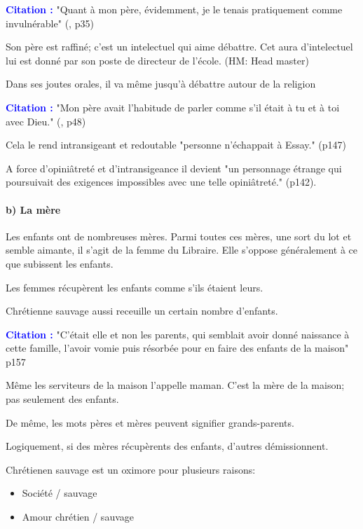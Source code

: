 \documentclass[a4paper, 11pt, hidelinks]{article}
\newcommand{\cit}{\large \textcolor{blue}{\textbf{Citation :}} \large }
\newcommand{\rb}[1]{\Romanbar{#1}}
\begin{document}
\cit "Quant à mon père, évidemment, je le tenais pratiquement comme invulnérable" (\rb{1}, p35)


Son père est raffiné; c'est un intelectuel qui aime débattre. Cet aura d'intelectuel lui est donné par son poste de directeur de l'école. (HM: Head master)


Dans ses joutes orales, il va même jusqu'à débattre autour de la religion

\cit "Mon père avait l'habitude de parler comme s'il était à tu et à toi avec Dieu." (\rb{1}, p48)

Cela le rend intransigeant et redoutable "personne n'échappait à Essay." (p147)

A force d'opiniâtreté et d'intransigeance il devient "un personnage étrange qui poursuivait des exigences impossibles avec une telle opiniâtreté." (p142).





\paragraph{b) La mère}



Les enfants ont de nombreuses mères. Parmi toutes ces mères, une sort du lot et semble aimante, il s'agit de la femme du Libraire. 
Elle s'oppose généralement à ce que subissent les enfants.



Les femmes récupèrent les enfants comme s'ils étaient leurs.

Chrétienne sauvage aussi receuille un certain nombre d'enfants.

\cit "C'était elle et non les parents, qui semblait avoir donné naissance à cette famille, l'avoir vomie puis résorbée pour en faire des enfants de la maison" \rb{6} p157


Même les serviteurs de la maison l'appelle maman. C'est la mère de la maison; pas seulement des enfants.

De même, les mots pères et mères peuvent signifier grands-parents. 


Logiquement, si des mères récupèrents des enfants, d'autres démissionnent.


Chrétienen sauvage est un oximore pour plusieurs raisons: 
\begin{itemize}
    \item Société / sauvage
    \item Amour chrétien / sauvage
\end{itemize}
\end{document}
